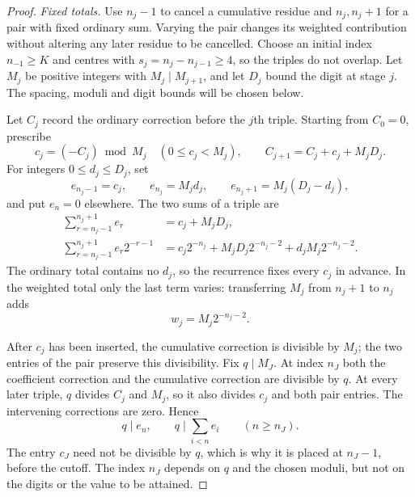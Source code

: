 \begin{proof}
\emph{Fixed totals.}
Use $n_j-1$ to cancel a cumulative residue and $n_j,n_j+1$ for a
pair with fixed ordinary sum.  Varying the pair changes its weighted
contribution without altering any later residue to be cancelled.
Choose an initial index $n_{-1}\ge K$ and centres with
$s_j=n_j-n_{j-1}\ge4$, so the triples do not overlap.  Let
$M_j$ be positive integers with $M_j\mid M_{j+1}$, and let $D_j$
bound the digit at stage $j$.  The spacing, moduli and digit bounds
will be chosen below.

Let $C_j$ record the ordinary correction before the $j$th triple.
Starting from $C_0=0$, prescribe
\[
 c_j=(-C_j)\bmod M_j\quad(0\le c_j<M_j),\qquad
 C_{j+1}=C_j+c_j+M_jD_j.
\]
For integers $0\le d_j\le D_j$, set
\begin{equation}\label{long251:eq:sparse-triple}
 e_{n_j-1}=c_j,\qquad e_{n_j}=M_jd_j,\qquad
 e_{n_j+1}=M_j(D_j-d_j),
\end{equation}
and put $e_n=0$ elsewhere.  The two sums of a triple are
\[
 \begin{aligned}
 \sum_{r=n_j-1}^{n_j+1}e_r
    &=c_j+M_jD_j,\\
 \sum_{r=n_j-1}^{n_j+1}e_r2^{-r-1}
    &=c_j2^{-n_j}+M_jD_j2^{-n_j-2}+d_jM_j2^{-n_j-2}.
 \end{aligned}
\]
The ordinary total contains no $d_j$, so the recurrence fixes every
$c_j$ in advance.  In the weighted total only the last term varies:
transferring $M_j$ from $n_j+1$ to $n_j$ adds
\[
 w_j=M_j2^{-n_j-2}.
\]

After $c_j$ has been inserted, the cumulative correction is divisible
by $M_j$; the two entries of the pair preserve this divisibility.
Fix $q\mid M_J$.  At index $n_J$ both the coefficient correction and
the cumulative correction are divisible by $q$.  At every later
triple, $q$ divides $C_j$ and $M_j$, so it also divides $c_j$ and
both pair entries.  The intervening corrections are zero.  Hence
\[
 q\mid e_n,\qquad q\mid\sum_{i<n}e_i\qquad(n\ge n_J).
\]
The entry $c_J$ need not be divisible by $q$, which is why it is placed at
$n_J-1$, before the cutoff.  The index $n_J$ depends on $q$ and the chosen
moduli, but not on the digits or the value to be attained.


\end{proof}
